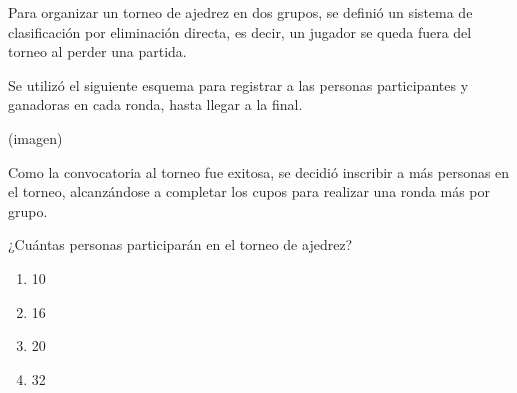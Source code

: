 \begin{problem}
    Para organizar un torneo de ajedrez en dos grupos, se definió un sistema de clasificación por eliminación directa, es decir, un jugador se queda fuera del torneo al perder una partida.

    Se utilizó el siguiente esquema para registrar a las personas participantes y ganadoras en cada ronda, hasta llegar a la final.

    \begin{center}
    (imagen)
    \end{center}

    Como la convocatoria al torneo fue exitosa, se decidió inscribir a más personas en el torneo, alcanzándose a completar los cupos para realizar una ronda más por grupo.

    ¿Cuántas personas participarán en el torneo de ajedrez?

    \begin{enumerate}[label=\Alph*.]
        \item 10
        \item 16
        \item 20
        \item 32
    \end{enumerate}
\end{problem}
